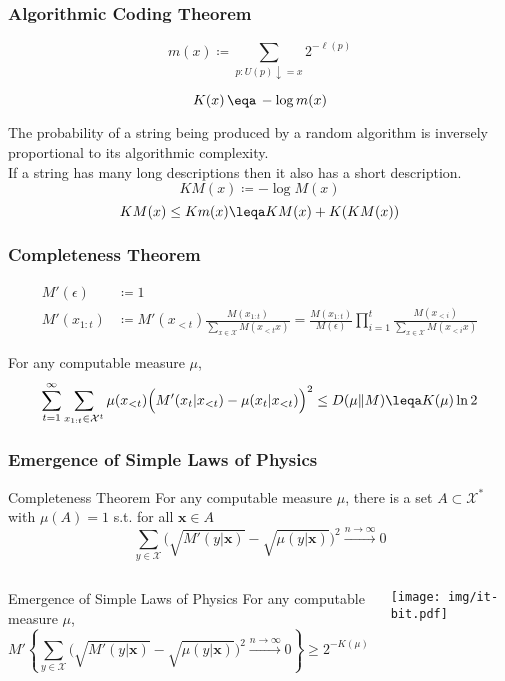 \documentclass[UTF8,11pt,colorlinks,compress,openany]{beamer}%
\begin{document}
\begin{frame}\frametitle{Algorithmic Coding Theorem}
	\begin{block}{}
	\[m(x)\coloneqq \sum\limits_{p:U(p)\downarrow=x}2^{-\ell(p)}\]
	\end{block}
	\begin{theorem}
		\[K(x)\,\eqa\,-\log m(x)\]
	\end{theorem}
	The probability of a string being produced by a random algorithm is inversely proportional to its algorithmic complexity.\\
	If a string has many long descriptions then it also has a short description.
	\[KM(x)\coloneqq -\log M(x)\]
	\[KM(x)\leq Km(x)\leqa KM(x)+K(KM(x))\]
\end{frame}

\begin{frame}\frametitle{Completeness Theorem}
	\begin{align*}
	M'(\epsilon)&\coloneqq 1\\
	M'(x_{1:t})&\coloneqq M'(x_{<t})\frac{M(x_{1:t})}{\sum\limits_{x\in\mathcal{X}}M(x_{<t}x)}=\frac{M(x_{1:t})}{M(\epsilon)}\prod\limits_{i=1}^t\frac{M(x_{<i})}{\sum\limits_{x\in\mathcal{X}}M(x_{<i}x)}
	\end{align*}
	\begin{theorem}
		For any computable measure $\mu$,
		\[\sum\limits_{t=1}^\infty\sum\limits_{x_{1:t}\in\mathcal{X}^t}\mu(x_{<t})\Big(M'(x_t|x_{<t})-\mu(x_t|x_{<t})\Big)^2\leq D(\mu\|M) \leqa K(\mu)\ln2\]
	\end{theorem}
\end{frame}

\begin{frame}\frametitle{Emergence of Simple Laws of Physics}
	\begin{block}{Completeness Theorem}
	For any computable measure $\mu$, there is a set $A\subset\mathcal{X}^*$ with $\mu(A)=1$ s.t. for all $\mathbf{x}\in A$
	\[\sum\limits_{y\in\mathcal{X}}\Big(\sqrt{M'(y|\mathbf{x})}-\sqrt{\mu(y|\mathbf{x})}\Big)^2\xrightarrow{n\to\infty}0\]
	\end{block}
\begin{columns}
	\begin{block}{Emergence of Simple Laws of Physics}
	For any computable measure $\mu$,
	\[M'\left\{\sum\limits_{y\in\mathcal{X}}\Big(\sqrt{M'(y|\mathbf{x})}-\sqrt{\mu(y|\mathbf{x})}\Big)^2\xrightarrow{n\to\infty}0\right\}\geq 2^{-K(\mu)}\]
	\end{block}
\texttt{[image: img/it-bit.pdf]}
\end{columns}
\end{frame}
\end{document}

